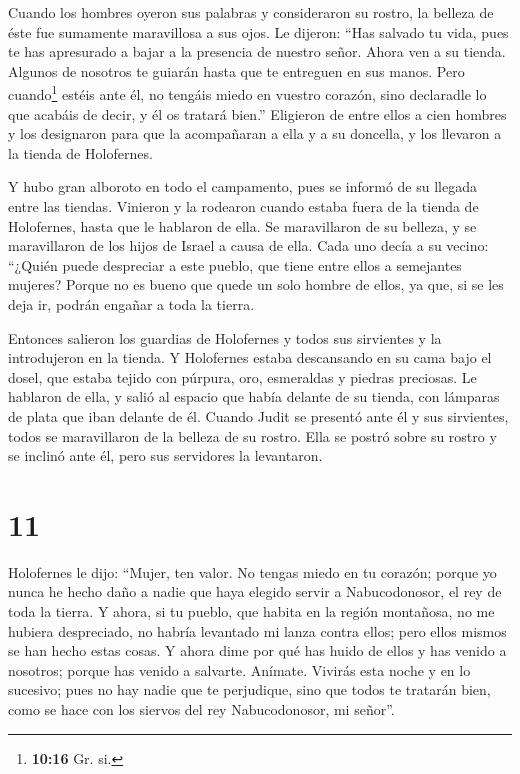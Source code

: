  Cuando los hombres oyeron sus palabras y consideraron su
rostro, la belleza de éste fue sumamente maravillosa a sus ojos. Le
dijeron:  ``Has salvado tu vida, pues te has apresurado a
bajar a la presencia de nuestro señor. Ahora ven a su tienda. Algunos de
nosotros te guiarán hasta que te entreguen en sus manos. 
Pero cuando\footnote{\textbf{10:16} Gr. si.} estéis ante él, no tengáis
miedo en vuestro corazón, sino declaradle lo que acabáis de decir, y él
os tratará bien.''  Eligieron de entre ellos a cien
hombres y los designaron para que la acompañaran a ella y a su doncella,
y los llevaron a la tienda de Holofernes.

 Y hubo gran alboroto en todo el campamento, pues se
informó de su llegada entre las tiendas. Vinieron y la rodearon cuando
estaba fuera de la tienda de Holofernes, hasta que le hablaron de ella.
 Se maravillaron de su belleza, y se maravillaron de los
hijos de Israel a causa de ella. Cada uno decía a su vecino: ``¿Quién
puede despreciar a este pueblo, que tiene entre ellos a semejantes
mujeres? Porque no es bueno que quede un solo hombre de ellos, ya que,
si se les deja ir, podrán engañar a toda la tierra.

 Entonces salieron los guardias de Holofernes y todos sus
sirvientes y la introdujeron en la tienda.  Y Holofernes
estaba descansando en su cama bajo el dosel, que estaba tejido con
púrpura, oro, esmeraldas y piedras preciosas.  Le
hablaron de ella, y salió al espacio que había delante de su tienda, con
lámparas de plata que iban delante de él.  Cuando Judit
se presentó ante él y sus sirvientes, todos se maravillaron de la
belleza de su rostro. Ella se postró sobre su rostro y se inclinó ante
él, pero sus servidores la levantaron.

\hypertarget{section-10}{%
\section{11}\label{section-10}}

 Holofernes le dijo: ``Mujer, ten valor. No tengas miedo
en tu corazón; porque yo nunca he hecho daño a nadie que haya elegido
servir a Nabucodonosor, el rey de toda la tierra.  Y
ahora, si tu pueblo, que habita en la región montañosa, no me hubiera
despreciado, no habría levantado mi lanza contra ellos; pero ellos
mismos se han hecho estas cosas.  Y ahora dime por qué has
huido de ellos y has venido a nosotros; porque has venido a salvarte.
Anímate. Vivirás esta noche y en lo sucesivo;  pues no hay
nadie que te perjudique, sino que todos te tratarán bien, como se hace
con los siervos del rey Nabucodonosor, mi señor''.

